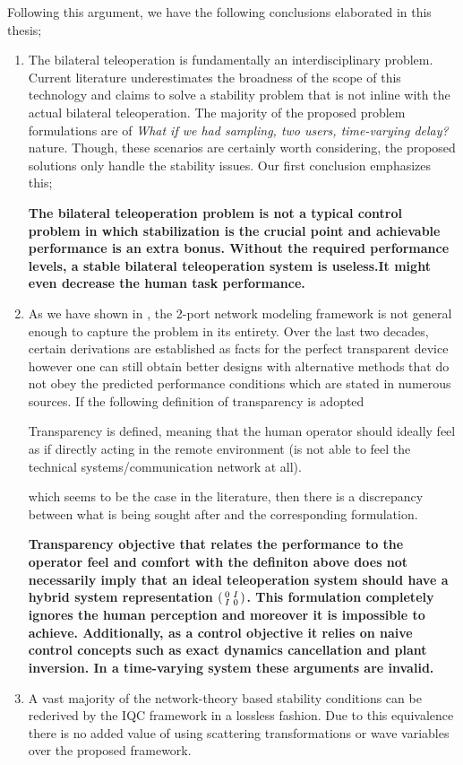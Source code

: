 Following this argument, we have the following conclusions elaborated in this thesis;
\begin{enumerate}
	\item The bilateral teleoperation is fundamentally an interdisciplinary problem. Current literature underestimates the broadness of the 
    scope of this technology and claims to solve a stability problem that is not inline with the actual bilateral teleoperation. The majority
    of the proposed problem formulations are of \emph{What if we had sampling, two users, time-varying delay?} nature. Though, these scenarios 
    are certainly worth considering, the proposed solutions only handle the stability issues. Our first conclusion emphasizes this;
    
    {\bfseries The bilateral teleoperation problem is not a typical control problem in which stabilization is the crucial point and 
    achievable performance is an extra bonus. Without the required performance levels, a stable bilateral teleoperation system is useless.It 
    might even decrease the human task performance.}
    
    \item As we have shown in , the 2-port network modeling framework is not general enough to capture the problem in
    its entirety. Over the last two decades, certain derivations are established as facts for the perfect transparent device however one 
    can still obtain better designs with alternative methods that do not obey the predicted performance conditions which are stated in 
    numerous sources. If the following definition of transparency is adopted
    \begin{displayquote}
    Transparency is defined, meaning that the human operator should ideally feel as if directly acting in the remote environment
    (is not able to feel the technical systems/communication network at all).
    \end{displayquote}
    which seems to be the case in the literature, then there is a discrepancy between what is being sought after and the corresponding 
    formulation. 
    
    {\bfseries Transparency objective that relates the performance to the operator feel and comfort with the definiton above does not 
    necessarily imply that an ideal teleoperation system should have a hybrid system representation $\begin{psmallmatrix}0&I\\I&0\end{psmallmatrix}$. 
    This formulation completely ignores the human perception and moreover it is impossible to achieve. Additionally, as a control objective 
    it relies on naive control concepts such as exact dynamics cancellation and plant inversion. In a time-varying system these arguments 
    are invalid.
    }
    \item A vast majority of the network-theory based stability conditions can be rederived by the IQC framework in a lossless fashion. 
    Due to this equivalence there is no added value of using scattering transformations or wave variables over the proposed framework. 
    

\end{enumerate}

